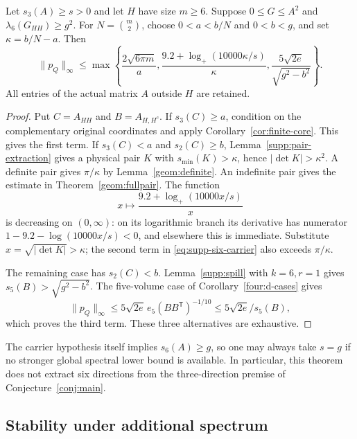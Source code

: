 \begin{theorem}
\label{supp:six-carrier}
Let $s_3(A)\ge s>0$ and let $H$ have size $m\ge6$.  Suppose
$0\le G\le A^2$ and $\lambda_6(G_{HH})\ge g^2$.
For $N=\binom m2$, choose $0<a<b/N$ and $0<b<g$, and set
$\kappa=b/N-a$.  Then
\begin{equation}\label{eq:supp-six-carrier}
 \|p_Q\|_\infty\le\max\left\{
 \frac{2\sqrt{6\pi m}}a,
 \frac{9.2+\log_+(10000\kappa/s)}\kappa,
 \frac{5\sqrt{2e}}{\sqrt{g^2-b^2}}\right\}.
\end{equation}
All entries of the actual matrix $A$ outside $H$ are retained.
\end{theorem}
\begin{proof}
Put $C=A_{HH}$ and $B=A_{H,H^c}$.  If $s_3(C)\ge a$,
condition on the complementary original coordinates and apply
Corollary~\ref{cor:finite-core}.  This gives the first term.
If $s_3(C)<a$ and $s_2(C)\ge b$,
Lemma~\ref{supp:pair-extraction} gives a physical pair $K$ with
$s_{\min}(K)>\kappa$, hence $|\det K|>\kappa^2$.
A definite pair gives $\pi/\kappa$ by Lemma~\ref{geom:definite}.
An indefinite pair gives the estimate in Theorem~\ref{geom:fullpair}.
The function
\[
 x\longmapsto\frac{9.2+\log_+(10000x/s)}x
\]
is decreasing on $(0,\infty)$: on its logarithmic branch its
derivative has numerator $1-9.2-\log(10000x/s)<0$, and
elsewhere this is immediate.  Substitute $x=\sqrt{|\det K|}
>\kappa$; the second term in \eqref{eq:supp-six-carrier}
also exceeds $\pi/\kappa$.

The remaining case has $s_2(C)<b$.
Lemma~\ref{supp:spill} with $k=6,r=1$ gives
$s_5(B)>\sqrt{g^2-b^2}$.
The five-volume case of Corollary~\ref{four:d-cases} gives
\[
 \|p_Q\|_\infty\le5\sqrt{2e}\,
       e_5(BB^{\mathsf T})^{-1/10}
 \le5\sqrt{2e}/s_5(B),
\]
which proves the third term.  These three alternatives are exhaustive.
\end{proof}

The carrier hypothesis itself implies $s_6(A)\ge g$, so one may
always take $s=g$ if no stronger global spectral lower bound is
available.  In particular, this theorem does not extract six directions
from the three-direction premise of Conjecture~\ref{conj:main}.

\subsection{Stability under additional spectrum}

